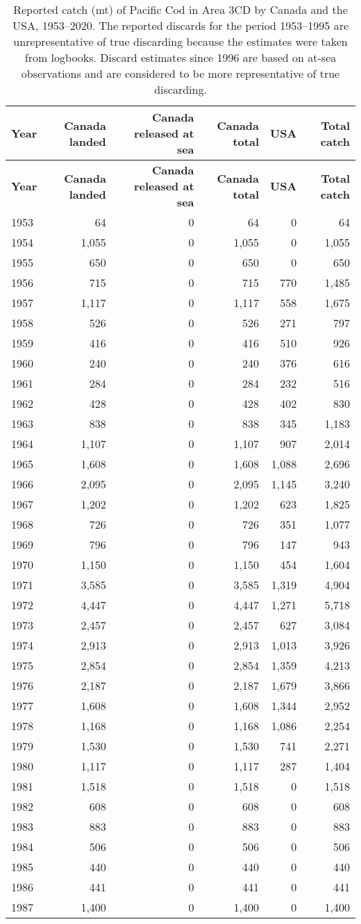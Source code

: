 \documentclass[11pt]{book}
\begin{document}
\begin{longtable}[]{@{}lrrrrr@{}}
\caption{\label{tab:tab-catch-3cd}Reported catch (mt) of Pacific Cod in Area 3CD by Canada and the USA, 1953--2020. The reported discards for the period 1953--1995 are unrepresentative of true discarding because the estimates were taken from logbooks. Discard estimates since 1996 are based on at-sea observations and are considered to be more representative of true discarding.}\tabularnewline
\toprule
\textbf{Year} & \textbf{Canada landed} & \textbf{Canada released at sea} & \textbf{Canada total} & \textbf{USA} & \textbf{Total catch}\tabularnewline
\midrule
\endfirsthead
\toprule
\textbf{Year} & \textbf{Canada landed} & \textbf{Canada released at sea} & \textbf{Canada total} & \textbf{USA} & \textbf{Total catch}\tabularnewline
\midrule
\endhead
1953 & 64 & 0 & 64 & 0 & 64\tabularnewline
1954 & 1,055 & 0 & 1,055 & 0 & 1,055\tabularnewline
1955 & 650 & 0 & 650 & 0 & 650\tabularnewline
1956 & 715 & 0 & 715 & 770 & 1,485\tabularnewline
1957 & 1,117 & 0 & 1,117 & 558 & 1,675\tabularnewline
1958 & 526 & 0 & 526 & 271 & 797\tabularnewline
1959 & 416 & 0 & 416 & 510 & 926\tabularnewline
1960 & 240 & 0 & 240 & 376 & 616\tabularnewline
1961 & 284 & 0 & 284 & 232 & 516\tabularnewline
1962 & 428 & 0 & 428 & 402 & 830\tabularnewline
1963 & 838 & 0 & 838 & 345 & 1,183\tabularnewline
1964 & 1,107 & 0 & 1,107 & 907 & 2,014\tabularnewline
1965 & 1,608 & 0 & 1,608 & 1,088 & 2,696\tabularnewline
1966 & 2,095 & 0 & 2,095 & 1,145 & 3,240\tabularnewline
1967 & 1,202 & 0 & 1,202 & 623 & 1,825\tabularnewline
1968 & 726 & 0 & 726 & 351 & 1,077\tabularnewline
1969 & 796 & 0 & 796 & 147 & 943\tabularnewline
1970 & 1,150 & 0 & 1,150 & 454 & 1,604\tabularnewline
1971 & 3,585 & 0 & 3,585 & 1,319 & 4,904\tabularnewline
1972 & 4,447 & 0 & 4,447 & 1,271 & 5,718\tabularnewline
1973 & 2,457 & 0 & 2,457 & 627 & 3,084\tabularnewline
1974 & 2,913 & 0 & 2,913 & 1,013 & 3,926\tabularnewline
1975 & 2,854 & 0 & 2,854 & 1,359 & 4,213\tabularnewline
1976 & 2,187 & 0 & 2,187 & 1,679 & 3,866\tabularnewline
1977 & 1,608 & 0 & 1,608 & 1,344 & 2,952\tabularnewline
1978 & 1,168 & 0 & 1,168 & 1,086 & 2,254\tabularnewline
1979 & 1,530 & 0 & 1,530 & 741 & 2,271\tabularnewline
1980 & 1,117 & 0 & 1,117 & 287 & 1,404\tabularnewline
1981 & 1,518 & 0 & 1,518 & 0 & 1,518\tabularnewline
1982 & 608 & 0 & 608 & 0 & 608\tabularnewline
1983 & 883 & 0 & 883 & 0 & 883\tabularnewline
1984 & 506 & 0 & 506 & 0 & 506\tabularnewline
1985 & 440 & 0 & 440 & 0 & 440\tabularnewline
1986 & 441 & 0 & 441 & 0 & 441\tabularnewline
1987 & 1,400 & 0 & 1,400 & 0 & 1,400\tabularnewline

\end{longtable}
\end{document}
